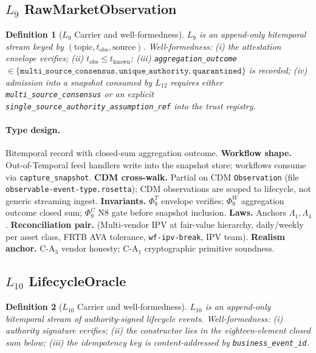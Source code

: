 \documentclass[11pt,a4paper]{article}
\newtheorem{definition}{Definition}[section]
\begin{document}
\subsection{$L_9$ RawMarketObservation}
\label{sec:leaf-l9}

\begin{definition}[$L_9$ Carrier and well-formedness]
$L_9$ is an append-only bitemporal stream keyed by $(\text{topic}, t_{\mathrm{obs}}, \text{source})$. Well-formedness: (i) the attestation envelope verifies; (ii) $t_{\mathrm{obs}} \le t_{\mathrm{known}}$; (iii) \texttt{aggregation\_outcome} $\in \{\texttt{multi\_source\_consensus}, \texttt{unique\_authority}, \texttt{quarantined}\}$ is recorded; (iv) admission into a snapshot consumed by $L_{12}$ requires either \texttt{multi\_source\_consensus} or an explicit \texttt{single\_source\_authority\_assumption\_ref} into the trust registry.
\end{definition}

\paragraph{Type design.} Bitemporal record with closed-sum aggregation outcome. \textbf{Workflow shape.} Out-of-Temporal feed handlers write into the snapshot store; workflows consume via \texttt{capture\_snapshot}. \textbf{CDM cross-walk.} Partial on CDM \texttt{Observation} (file \texttt{observable-event-type.rosetta}); CDM observations are scoped to lifecycle, not generic streaming ingest. \textbf{Invariants.} $\Phi_9^T$ envelope verifies; $\Phi_9^W$ aggregation outcome closed sum; $\Phi_9^C$ N8 gate before snapshot inclusion. \textbf{Laws.} Anchors $\Lambda_1, \Lambda_4$. \textbf{Reconciliation pair.} (Multi-vendor IPV at fair-value hierarchy, daily/weekly per asset class, FRTB AVA tolerance, \texttt{wf-ipv-break}, IPV team). \textbf{Realism anchor.} $\mathrm{C\textrm{-}A}_3$ vendor honesty; $\mathrm{C\textrm{-}A}_1$ cryptographic primitive soundness.

\subsection{$L_{10}$ LifecycleOracle}
\label{sec:leaf-l10}

\begin{definition}[$L_{10}$ Carrier and well-formedness]
$L_{10}$ is an append-only bitemporal stream of authority-signed lifecycle events. Well-formedness: (i) authority signature verifies; (ii) the constructor lies in the eighteen-element closed sum below; (iii) the idempotency key is content-addressed by \texttt{business\_event\_id}.
\end{definition}
\end{document}
